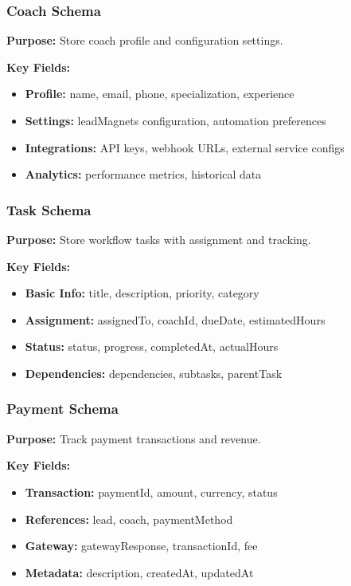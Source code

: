 \documentclass[12pt,a4paper]{article}
\begin{document}
\subsubsection{Coach Schema}
\textbf{Purpose:} Store coach profile and configuration settings.

\textbf{Key Fields:}
\begin{itemize}
    \item \textbf{Profile:} name, email, phone, specialization, experience
    \item \textbf{Settings:} leadMagnets configuration, automation preferences
    \item \textbf{Integrations:} API keys, webhook URLs, external service configs
    \item \textbf{Analytics:} performance metrics, historical data
\end{itemize}

\subsubsection{Task Schema}
\textbf{Purpose:} Store workflow tasks with assignment and tracking.

\textbf{Key Fields:}
\begin{itemize}
    \item \textbf{Basic Info:} title, description, priority, category
    \item \textbf{Assignment:} assignedTo, coachId, dueDate, estimatedHours
    \item \textbf{Status:} status, progress, completedAt, actualHours
    \item \textbf{Dependencies:} dependencies, subtasks, parentTask
\end{itemize}

\subsubsection{Payment Schema}
\textbf{Purpose:} Track payment transactions and revenue.

\textbf{Key Fields:}
\begin{itemize}
    \item \textbf{Transaction:} paymentId, amount, currency, status
    \item \textbf{References:} lead, coach, paymentMethod
    \item \textbf{Gateway:} gatewayResponse, transactionId, fee
    \item \textbf{Metadata:} description, createdAt, updatedAt
\end{itemize}
\end{document}
